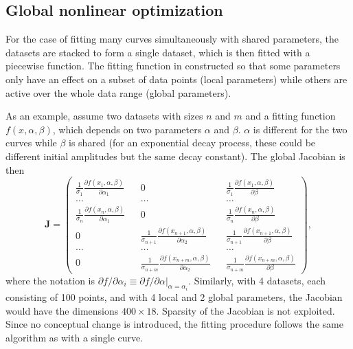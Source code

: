 \documentclass{article}
\begin{document}
\subsection{Global nonlinear optimization}

For the case of fitting many curves simultaneously with shared
parameters, the datasets are stacked to form a single dataset, which
is then fitted with a piecewise function. The fitting function in
constructed so that some parameters only have an effect on a subset of
data points (local parameters) while others are active over the whole
data range (global parameters).

As an example, assume two datasets with sizes $n$ and $m$ and a
fitting function $f(x,\alpha,\beta)$, which depends on two parameters
$\alpha$ and $\beta$. $\alpha$ is different for the two curves while
$\beta$ is shared (for an exponential decay process, these could be
different initial amplitudes but the same decay constant). The global
Jacobian is then
\begin{equation}
  \label{eq:globalJacob}
  \bm J =
  \left( \begin{matrix}
      \frac{1}{\sigma_1} \frac{\partial f(x_1, \alpha, \beta)}
      {\partial\alpha_1} && 0 && \frac{1}{\sigma_1} \frac{\partial
        f(x_1, \alpha, \beta)} {\partial\beta} \\
      \ldots && \ldots && \ldots \\
      \frac{1}{\sigma_n} \frac{\partial f(x_n, \alpha, \beta)}
      {\partial\alpha_1} && 0 && \frac{1}{\sigma_n} \frac{\partial
        f(x_n, \alpha, \beta)} {\partial\beta} \\
      0 && \frac{1}{\sigma_{n+1}} \frac{\partial f(x_{n+1}, \alpha,
        \beta)} {\partial\alpha_2} && \frac{1}{\sigma_{n+1}}
      \frac{\partial f(x_{n+1}, \alpha, \beta)} {\partial\beta} \\
      \ldots && \ldots && \ldots \\
      0 && \frac{1}{\sigma_{n+m}} \frac{\partial f(x_{n+m}, \alpha,
        \beta)} {\partial\alpha_2} && \frac{1}{\sigma_{n+m}}
      \frac{\partial f(x_{n+m}, \alpha, \beta)} {\partial\beta}
    \end{matrix} \right),
\end{equation}
where the notation is
$\partial f / \partial\alpha_i \equiv \partial f / \partial\alpha
|_{\alpha = \alpha_i}$.
Similarly, with 4 datasets, each consisting of 100 points, and with 4
local and 2 global parameters, the Jacobian would have the dimensions
$400\times18$. Sparsity of the Jacobian is not exploited. Since no
conceptual change is introduced, the fitting procedure follows the
same algorithm as with a single curve.
\end{document}
